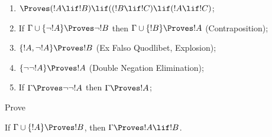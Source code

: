 \begin{prop}
\begin{enumerate}
\item $\Proves (!A \lif !B) \lif ((!B \lif !C)
  \lif (!A \lif !C)$; 
\item If $\Gamma \cup \{ \lnot !A\}
  \Proves \lnot !B$ then $\Gamma \cup \{ !B\} \Proves
  !A$ (Contraposition); 
\item  $\{ !A, \lnot!A\} \Proves
    !B$ (Ex Falso Quodlibet, Explosion); 
\item  $\{ \lnot\lnot!A\} \Proves
  !A$ (Double Negation Elimination);
\item If $\Gamma \Proves \lnot\lnot!A$ then $\Gamma \Proves
  !A$;
\end{enumerate}
\end{prop}


\begin{prob}
  Prove 
\end{prob}







  



\begin{thm}
 If $\Gamma \cup \{!A\} \Proves !B$,
then $\Gamma \Proves !A \lif !B$.
\end{thm}

